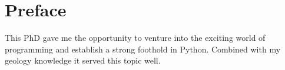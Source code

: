 \chapter*{Preface}                                  \label{ch:preface}

This PhD gave me the opportunity to venture into the exciting world of programming and establish a strong foothold in Python. Combined with my geology knowledge it served this topic well.

\instructionspreface


\cleardoublepage

